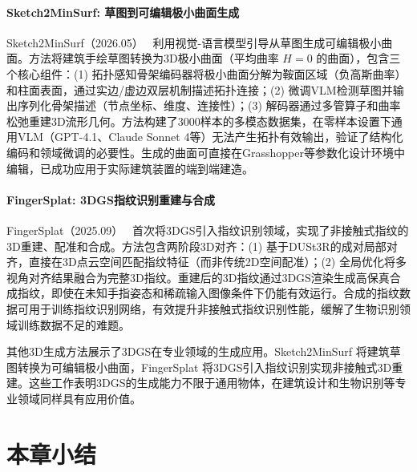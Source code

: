 \paragraph{Sketch2MinSurf: 草图到可编辑极小曲面生成}

Sketch2MinSurf（2026.05）~\cite{2605_20733} 利用视觉-语言模型引导从草图生成可编辑极小曲面。方法将建筑手绘草图转换为3D极小曲面（平均曲率 $H=0$ 的曲面），包含三个核心组件：(1) 拓扑感知骨架编码器将极小曲面分解为鞍面区域（负高斯曲率）和柱面表面，通过实边/虚边双层机制描述拓扑连接；(2) 微调VLM检测草图并输出序列化骨架描述（节点坐标、维度、连接性）；(3) 解码器通过多管算子和曲率松弛重建3D流形几何。方法构建了3000样本的多模态数据集，在零样本设置下通用VLM（GPT-4.1、Claude Sonnet 4等）无法产生拓扑有效输出，验证了结构化编码和领域微调的必要性。生成的曲面可直接在Grasshopper等参数化设计环境中编辑，已成功应用于实际建筑装置的端到端建造。

\paragraph{FingerSplat: 3DGS指纹识别重建与合成}

FingerSplat（2025.09）~\cite{2509_15648} 首次将3DGS引入指纹识别领域，实现了非接触式指纹的3D重建、配准和合成。方法包含两阶段3D对齐：(1) 基于DUSt3R的成对局部对齐，直接在3D点云空间匹配指纹特征（而非传统2D空间配准）；(2) 全局优化将多视角对齐结果融合为完整3D指纹。重建后的3D指纹通过3DGS渲染生成高保真合成指纹，即使在未知手指姿态和稀疏输入图像条件下仍能有效运行。合成的指纹数据可用于训练指纹识别网络，有效提升非接触式指纹识别性能，缓解了生物识别领域训练数据不足的难题。

\begin{takeaway}
其他3D生成方法展示了3DGS在专业领域的生成应用。Sketch2MinSurf 将建筑草图转换为可编辑极小曲面，FingerSplat 将3DGS引入指纹识别实现非接触式3D重建。这些工作表明3DGS的生成能力不限于通用物体，在建筑设计和生物识别等专业领域同样具有应用价值。
\end{takeaway}




\section*{本章小结}

